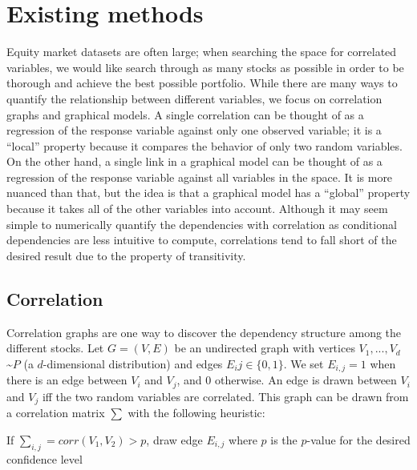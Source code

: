 \section{Existing methods}
\label{sec:numerical:existingmethods}

Equity market datasets are often large; when searching the space for correlated variables, we would like search through as many stocks as possible in order to be thorough and achieve the best possible portfolio. While there are many ways to quantify the relationship between different variables, we focus on correlation graphs and graphical models. A single correlation can be thought of as a regression of the response variable against only one observed variable; it is a ``local'' property because it compares the behavior of only two random variables. On the other hand, a single link in a graphical model can be thought of as a regression of the response variable against all variables in the space. It is more nuanced than that, but the idea is that a graphical model has a “global” property because it takes all of the other variables into account. Although it may seem simple to numerically quantify the dependencies with correlation as conditional dependencies are less intuitive to compute, correlations tend to fall short of the desired result due to the property of transitivity.

\subsection{Correlation}
Correlation graphs are one way to discover the dependency structure among the different stocks. Let $G=(V,E)$ be an undirected graph with vertices $V_{1},...,V_{d}$ \textasciitilde $P$ (a $d$-dimensional distribution) and edges $E_ij\in\{0,1\}$. We set $E_{i,j}=1$ when there is an edge between $V_i$ and $V_j$, and 0 otherwise. An edge is drawn between $V_i$ and $V_j$ iff the two random variables are correlated. This graph can be drawn from a correlation matrix $\sum$ with the following heuristic:\\

\begin{algorithm}
If $\sum_{i,j}=corr(V_1,V_2)>p$, draw edge $E_{i,j}$ where $p$ is the $p$-value for the desired confidence level
\end{algorithm}

